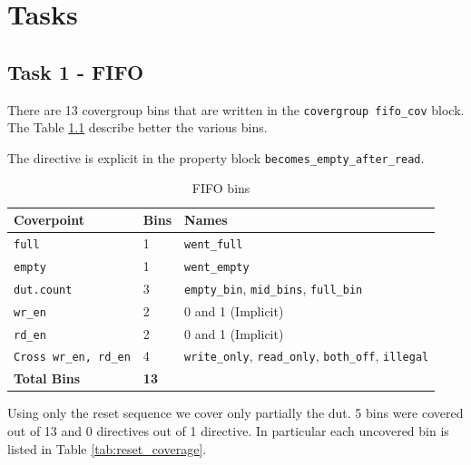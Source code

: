 \chapter{Tasks}
\label{cha:tasks}

\section{Task 1 - FIFO}

There are 13 covergroup bins that are written in the \texttt{covergroup fifo\_cov} block.
The Table \ref{tab:fifo_bins} describe better the various bins.

The directive is explicit in the property block \texttt{becomes\_empty\_after\_read}.

\begin{table}[H]
	\centering
	\begin{tabular}{@{}lll@{}}
		\toprule
		\textbf{Coverpoint}         	& \textbf{Bins}	& \textbf{Names} 																	\\ \midrule
		\texttt{full}               	& 1 	        & \texttt{went\_full} 																\\
		\texttt{empty}              	& 1 	        & \texttt{went\_empty} 																\\
		\texttt{dut.count}          	& 3 	        & \texttt{empty\_bin}, \texttt{mid\_bins}, \texttt{full\_bin} 						\\
		\texttt{wr\_en}             	& 2 	        & 0 and 1 (Implicit) 																\\
		\texttt{rd\_en}             	& 2 	        & 0 and 1 (Implicit) 																\\
		\texttt{Cross wr\_en, rd\_en}	& 4 	        & \texttt{write\_only}, \texttt{read\_only}, \texttt{both\_off}, \texttt{illegal} 	\\ \midrule
		\textbf{Total Bins}         	& \textbf{13}   & 																					\\ \bottomrule
	\end{tabular}
	\caption{FIFO bins}
	\label{tab:fifo_bins}
\end{table}

Using only the reset sequence we cover only partially the dut.
5 bins were covered out of 13 and 0 directives out of 1 directive.
In particular each uncovered bin is listed in Table \ref{tab:reset_coverage}.

